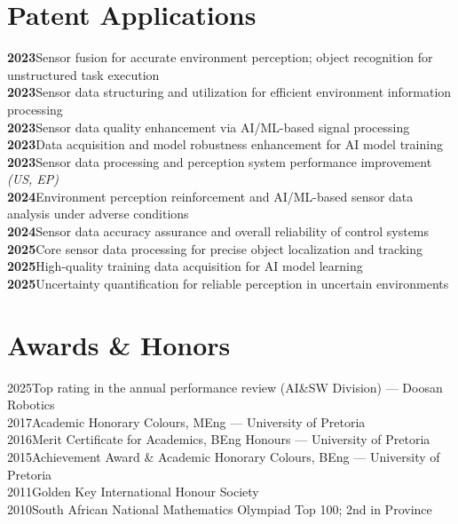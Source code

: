 \documentclass[letterpaper,11pt]{article}
\begin{document}
\section{Patent Applications }
 \begin{itemize}[leftmargin=0.15in, label={}]
    \small{\item{
      \textbf{2023}\enspace Sensor fusion for accurate environment perception; object recognition for unstructured task execution \\
      \textbf{2023}\enspace Sensor data structuring and utilization for efficient environment information processing \\
      \textbf{2023}\enspace Sensor data quality enhancement via AI/ML-based signal processing \\
      \textbf{2023}\enspace Data acquisition and model robustness enhancement for AI model training \\
      \textbf{2023}\enspace Sensor data processing and perception system performance improvement \textit{(US, EP)} \\
      \textbf{2024}\enspace Environment perception reinforcement and AI/ML-based sensor data analysis under adverse conditions \\
      \textbf{2024}\enspace Sensor data accuracy assurance and overall reliability of control systems \\
      \textbf{2025}\enspace Core sensor data processing for precise object localization and tracking \\
      \textbf{2025}\enspace High-quality training data acquisition for AI model learning \\
      \textbf{2025}\enspace Uncertainty quantification for reliable perception in uncertain environments
    }}
 \end{itemize}

\section{Awards \& Honors}
 \begin{itemize}[leftmargin=0.15in, label={}]
    \small{\item{
      2025\enspace Top rating in the annual performance review (AI\&SW Division) --- Doosan Robotics \\
      2017\enspace Academic Honorary Colours, MEng --- University of Pretoria \\
      2016\enspace Merit Certificate for Academics, BEng Honours --- University of Pretoria \\
      2015\enspace Achievement Award \& Academic Honorary Colours, BEng --- University of Pretoria \\
      2011\enspace Golden Key International Honour Society \\
      2010\enspace South African National Mathematics Olympiad Top 100; 2nd in Province
    }}
 \end{itemize}

\end{document}
